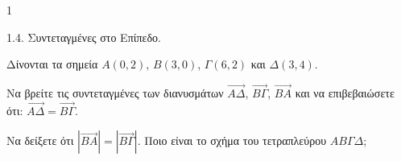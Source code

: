 \begin{ylh}{1}
    \item 1.4. Συντεταγμένες στο Επίπεδο.
\end{ylh}
Δίνονται τα σημεία $A(0, 2)$, $B(3, 0)$, $\Gamma(6,2)$ και $\Delta(3,4)$.
\begin{alist}
\item Να βρείτε τις συντεταγμένες των διανυσμάτων $\overrightarrow{A\Delta}$, $\overrightarrow{B\Gamma}$, $\overrightarrow{BA}$ και να επιβεβαιώσετε ότι: $\overrightarrow{A\Delta} = \overrightarrow{B\Gamma}$. 
\item Να δείξετε ότι $|\overrightarrow{BA}| = |\overrightarrow{B\Gamma}|$. Ποιο είναι το σχήμα του τετραπλεύρου $AB\Gamma\Delta$; 
\end{alist}
